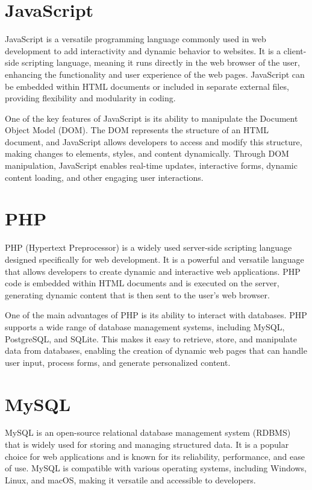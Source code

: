 \documentclass[a4paper,11pt]{report}
\begin{document}
\section{JavaScript}
JavaScript is a versatile programming language commonly used in web development to add interactivity and dynamic behavior to websites. It is a client-side scripting language, meaning it runs directly in the web browser of the user, enhancing the functionality and user experience of the web pages. JavaScript can be embedded within HTML documents or included in separate external files, providing flexibility and modularity in coding.

One of the key features of JavaScript is its ability to manipulate the Document Object Model (DOM). The DOM represents the structure of an HTML document, and JavaScript allows developers to access and modify this structure, making changes to elements, styles, and content dynamically. Through DOM manipulation, JavaScript enables real-time updates, interactive forms, dynamic content loading, and other engaging user interactions.

\section{PHP}
PHP (Hypertext Preprocessor) is a widely used server-side scripting language designed specifically for web development. It is a powerful and versatile language that allows developers to create dynamic and interactive web applications. PHP code is embedded within HTML documents and is executed on the server, generating dynamic content that is then sent to the user's web browser.

One of the main advantages of PHP is its ability to interact with databases. PHP supports a wide range of database management systems, including MySQL, PostgreSQL, and SQLite. This makes it easy to retrieve, store, and manipulate data from databases, enabling the creation of dynamic web pages that can handle user input, process forms, and generate personalized content.

\section{MySQL}
MySQL is an open-source relational database management system (RDBMS) that is widely used for storing and managing structured data. It is a popular choice for web applications and is known for its reliability, performance, and ease of use. MySQL is compatible with various operating systems, including Windows, Linux, and macOS, making it versatile and accessible to developers.
\end{document}
